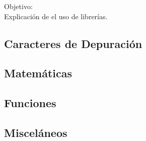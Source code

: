 \documentclass{article}
\begin{document}
Objetivo:\\

Explicación de el uso de librerías.\citep{OpenSCS}\\

\subsection{Caracteres de Depuración}


\citep{OpenSCS}

\subsection{Matemáticas}


\citep{OpenSCS}

\subsection{Funciones}


\citep{OpenSCS}

\subsection{Misceláneos}


\citep{OpenSCS}





\end{document}
